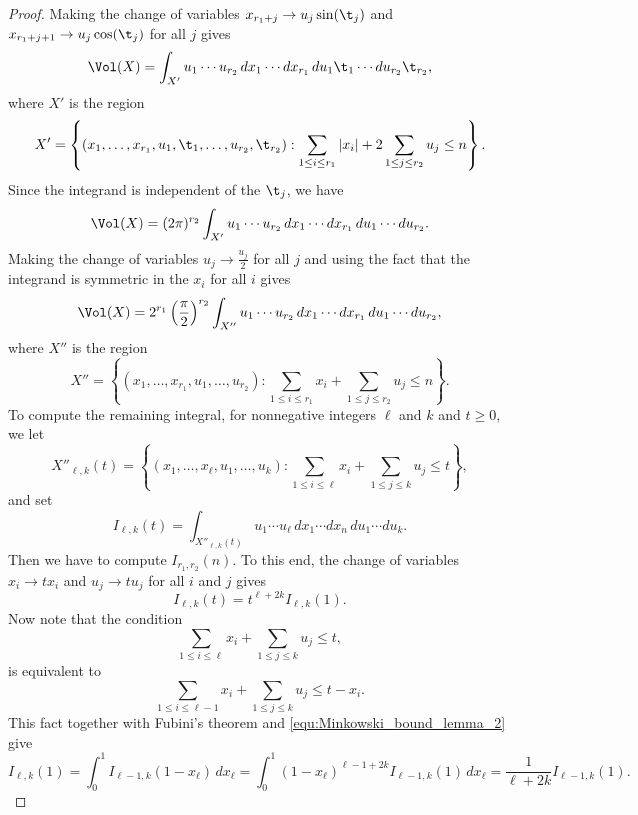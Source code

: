     \begin{proof}
      Making the change of variables $x_{r_{1}+j} \to u_{j}\sin(\t_{j})$ and $x_{r_{1}+j+1} \to u_{j}\cos(\t_{j})$ for all $j$ gives
      \[
        \Vol(X) = \int_{X'}u_{1} \cdots u_{r_{2}}\,dx_{1} \cdots dx_{r_{1}}\,du_{1}\t_{1} \cdots du_{r_{2}}\t_{r_{2}},
      \]
      where $X'$ is the region
      \[
        X' = \left\{(x_{1},\ldots,x_{r_{1}},u_{1},\t_{1},\ldots,u_{r_{2}},\t_{r_{2}}):\sum_{1 \le i \le r_{1}}|x_{i}|+2\sum_{1 \le j \le r_{2}}u_{j} \le n\right\}.
      \]
      Since the integrand is independent of the $\t_{j}$, we have
      \[
        \Vol(X) = (2\pi)^{r_{2}}\int_{X'}u_{1} \cdots u_{r_{2}}\,dx_{1} \cdots dx_{r_{1}}\,du_{1} \cdots du_{r_{2}}.
      \]
      Making the change of variables $u_{j} \to \frac{u_{j}}{2}$ for all $j$ and using the fact that the integrand is symmetric in the $x_{i}$ for all $i$ gives
      \begin{equation}\label{equ:Minkowski_bound_lemma_1}
        \Vol(X) = 2^{r_{1}}\left(\frac{\pi}{2}\right)^{r_{2}}\int_{X''}u_{1} \cdots u_{r_{2}}\,dx_{1} \cdots dx_{r_{1}}\,du_{1} \cdots du_{r_{2}},
      \end{equation}
      where $X''$ is the region
      \[
        X'' = \left\{(x_{1},\ldots,x_{r_{1}},u_{1},\ldots,u_{r_{2}}):\sum_{1 \le i \le r_{1}}x_{i}+\sum_{1 \le j \le r_{2}}u_{j} \le n\right\}.
      \]
      To compute the remaining integral, for nonnegative integers $\ell$ and $k$ and $t \ge 0$, we let
      \[
        X''_{\ell,k}(t) = \left\{(x_{1},\ldots,x_{\ell},u_{1},\ldots,u_{k}):\sum_{1 \le i \le \ell}x_{i}+\sum_{1 \le j \le k}u_{j} \le t\right\},
      \]
      and set 
      \[
        I_{\ell,k}(t) = \int_{X''_{\ell,k}(t)}u_{1} \cdots u_{\ell}\,dx_{1} \cdots dx_{n}\,du_{1} \cdots du_{k}.
      \]
      Then we have to compute $I_{r_{1},r_{2}}(n)$. To this end, the change of variables $x_{i} \to tx_{i}$ and $u_{j} \to tu_{j}$ for all $i$ and $j$ gives
      \begin{equation}\label{equ:Minkowski_bound_lemma_2}
        I_{\ell,k}(t) = t^{\ell+2k}I_{\ell,k}(1).
      \end{equation}
      Now note that the condition
      \[
        \sum_{1 \le i \le \ell}x_{i}+\sum_{1 \le j \le k}u_{j} \le t,
      \]
      is equivalent to
      \[
        \sum_{1 \le i \le \ell-1}x_{i}+\sum_{1 \le j \le k}u_{j} \le t-x_{i}.
      \]
      This fact together with Fubini's theorem and \cref{equ:Minkowski_bound_lemma_2} give
      \[
        I_{\ell,k}(1) = \int_{0}^{1}I_{\ell-1,k}(1-x_{\ell})\,dx_{\ell} = \int_{0}^{1}(1-x_{\ell})^{\ell-1+2k}I_{\ell-1,k}(1)\,dx_{\ell} = \frac{1}{\ell+2k}I_{\ell-1,k}(1).
\]
\end{proof}
